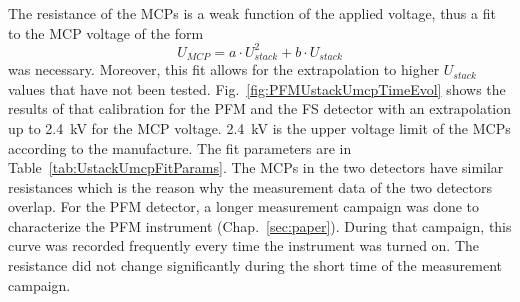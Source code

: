 	The resistance of the MCPs is a weak function of the applied voltage, thus a fit to the MCP voltage of the form
	\begin{equation}
		U_{MCP} = a\cdot U_{stack}^2 + b\cdot U_{stack}
		\label{eq:StackMCPCalib}
	\end{equation}
	was necessary. Moreover, this fit allows for the extrapolation to higher $U_{stack}$ values that have not been tested. Fig.~\ref{fig:PFMUstackUmcpTimeEvol} shows the results of that calibration for the PFM and the FS detector with an extrapolation up to 2.4~kV for the MCP voltage. 2.4~kV is the upper voltage limit of the MCPs according to the manufacture. The fit parameters are in Table~\ref{tab:UstackUmcpFitParams}. The MCPs in the two detectors have similar resistances which is the reason why the measurement data of the two detectors overlap. For the PFM detector, a longer measurement campaign was done to characterize the PFM instrument (Chap.~\ref{sec:paper}). During that campaign, this curve was recorded frequently every time the instrument was turned on. The resistance did not change significantly during the short time of the measurement campaign.
	
	

		
